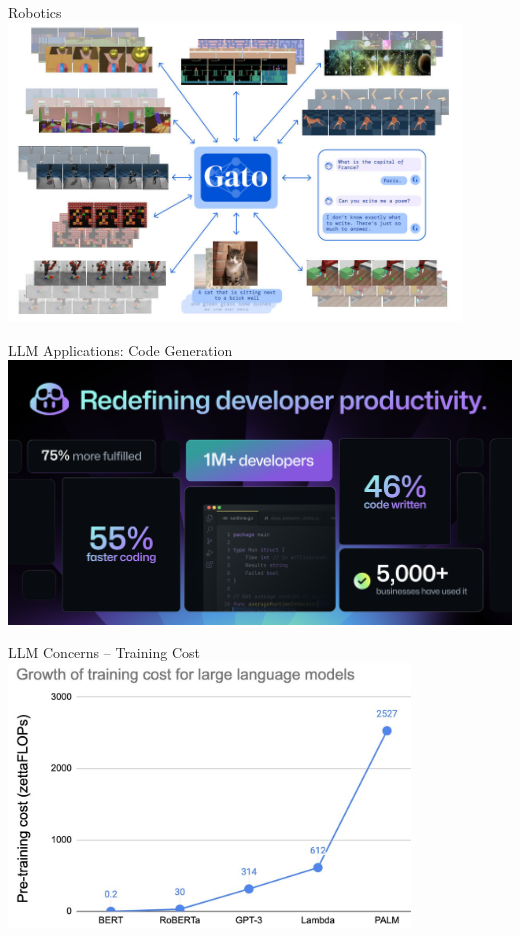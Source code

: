 \documentclass[presentation, 10pt]{beamer}\mode<presentation>{\usetheme{AMSBolognaFC}}
\begin{document}
\begin{frame}{Robotics}
	\centering
	\includegraphics[width=0.9\textwidth]{img/generalistic-agent.jpeg}
\end{frame}
\begin{frame}{LLM Applications: Code Generation}
\includegraphics[width=\textwidth]{img/copilot.png}
\end{frame}
\begin{frame}{LLM Concerns -- Training Cost}
\centering
\includegraphics[width=0.8\textwidth]{img/training-cost.jpg}
\end{frame}
\end{document}
